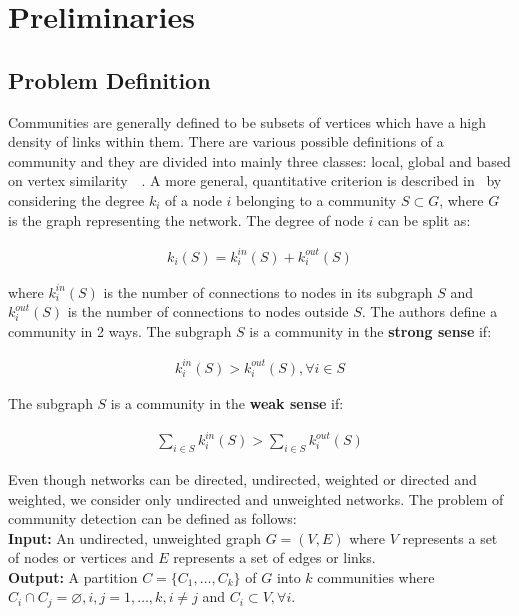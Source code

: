 \chapter{Preliminaries}
\begin{spacing}{1.5}
\thispagestyle{empty}
\section{Problem Definition}
Communities are generally defined to be subsets of vertices which have a high density of links within them. There are various possible definitions of a community and they are divided into mainly three classes: local, global and based on vertex similarity~\cite{Fortunato201075}~\cite{Wasserman-Social-1994}. A more general, quantitative criterion is described in~\cite{Radicchi02032004} by considering the degree $k_i$ of a node $i$ belonging to a community $S \subset G$, where $G$ is the graph representing the network. The degree of node $i$ can be split as:

\begin{align}
k_i(S) = k_i^{in}(S) + k_i^{out}(S)
\end{align}

where $k_i^{in}(S)$ is the number of connections to nodes in its subgraph $S$ and $k_i^{out}(S)$ is the number of connections to nodes outside $S$. The authors define a community in 2 ways. The subgraph $S$ is a community in the \textbf{strong sense} if:

\begin{align}
k_i^{in}(S) > k_i^{out}(S), \forall i \in S
\end{align}

\newpage
The subgraph $S$ is a community in the \textbf{weak sense} if:

\begin{align}
\displaystyle\sum_{i \in S} k_i^{in}(S) > \displaystyle\sum_{i \in S} k_i^{out}(S)
\end{align}

Even though networks can be directed, undirected, weighted or directed and weighted, we consider only undirected and unweighted networks. The problem of community detection can be defined as follows:\\

\noindent \textbf{Input: }An undirected, unweighted graph $G = (V, E)$ where $V$ represents a set of nodes or vertices and $E$ represents a set of edges or links. \\
\noindent \textbf{Output: }A partition $C = \{C_1, \ldots, C_k\}$ of $G$ into $k$ communities where $C_i \cap C_j = \varnothing, i, j = {1, \ldots, k}, i \neq j$ and $C_i \subset V,  \forall i$. \\


\end{spacing}
